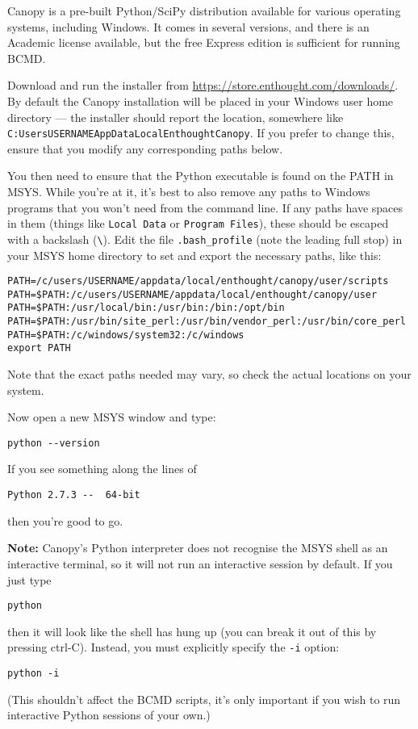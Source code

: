 \documentclass[a4paper,11pt]{article}
\begin{document}
Canopy is a pre-built Python/SciPy distribution available for various operating systems, including Windows. It comes in several versions, and there is an Academic license available, but the free Express edition is sufficient for running BCMD.

Download and run the installer from \url{https://store.enthought.com/downloads/}. By default the Canopy installation will be placed in your Windows user home directory --- the installer should report the location, somewhere like \texttt{C:UsersUSERNAMEAppDataLocalEnthoughtCanopy}. If you prefer to change this, ensure that you modify any corresponding paths below.

You then need to ensure that the Python executable is found on the PATH in MSYS. While you're at it, it's best to also remove any paths to Windows programs that you won't need from the command line. If any paths have spaces in them (things like \texttt{Local Data} or \texttt{Program Files}), these should be escaped with a backslash (\texttt{\textbackslash{}}). Edit the file \texttt{.bash\_profile} (note the leading full stop) in your MSYS home directory to set and export the necessary paths, like this:
\begin{verbatim}
PATH=/c/users/USERNAME/appdata/local/enthought/canopy/user/scripts
PATH=$PATH:/c/users/USERNAME/appdata/local/enthought/canopy/user
PATH=$PATH:/usr/local/bin:/usr/bin:/bin:/opt/bin
PATH=$PATH:/usr/bin/site_perl:/usr/bin/vendor_perl:/usr/bin/core_perl
PATH=$PATH:/c/windows/system32:/c/windows
export PATH
\end{verbatim}
Note that the exact paths needed may vary, so check the actual locations on your system.

Now open a new MSYS window and type:
\begin{verbatim}python --version\end{verbatim}

If you see something along the lines of
\begin{verbatim}
Python 2.7.3 --  64-bit
\end{verbatim}
then you're good to go.

\textbf{Note:} Canopy's Python interpreter does not recognise the MSYS shell as an interactive terminal, so it will not run an interactive session by default. If you just type
\begin{verbatim}python\end{verbatim}
then it will look like the shell has hung up (you can break it out of this by pressing ctrl-C). Instead, you must explicitly specify the \texttt{-i} option:
\begin{verbatim}
python -i
\end{verbatim}
(This shouldn't affect the BCMD scripts, it's only important if you wish to run interactive Python sessions of your own.)
\end{document}
